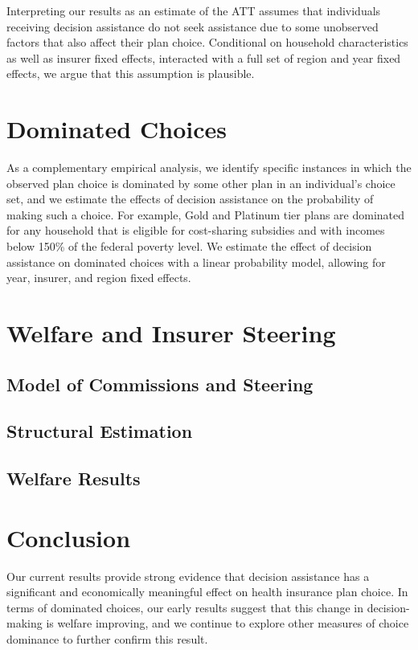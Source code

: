 \documentclass[12pt]{article}
\begin{document}
Interpreting our results as an estimate of the ATT assumes that individuals receiving decision assistance do not seek assistance due to some unobserved factors that also affect their plan choice. Conditional on household characteristics as well as insurer fixed effects, interacted with a full set of region and year fixed effects, we argue that this assumption is plausible. 


\section{Dominated Choices}
\label{sec:dominated}
As a complementary empirical analysis, we identify specific instances in which the observed plan choice is dominated by some other plan in an individual's choice set, and we estimate the effects of decision assistance on the probability of making such a choice. For example, Gold and Platinum tier plans are dominated for any household that is eligible for cost-sharing subsidies and with incomes below 150\% of the federal poverty level. We estimate the effect of decision assistance on dominated choices with a linear probability model, allowing for year, insurer, and region fixed effects.


\section{Welfare and Insurer Steering}
\label{sec:steering}


\subsection{Model of Commissions and Steering}
\label{subsec:steering-model}


\subsection{Structural Estimation}
\label{subsec:steering-methods}

\subsection{Welfare Results}
\label{subsec:steering-results}


\section{Conclusion}
\label{sec:conclusion}

Our current results provide strong evidence that decision assistance has a significant and economically meaningful effect on health insurance plan choice. In terms of dominated choices, our early results suggest that this change in decision-making is welfare improving, and we continue to explore other measures of choice dominance to further confirm this result.
\end{document}
